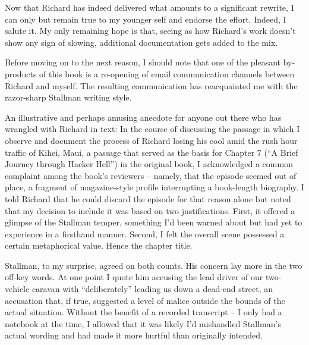\ifdefined\chs

\fi

\ifdefined\eng
Now that Richard has indeed delivered what amounts to a significant
rewrite, I can only but remain true to my younger self and endorse the
effort. Indeed, I salute it. My only remaining hope is that, seeing as
how Richard's work doesn't show any sign of slowing, additional
documentation gets added to the mix.
\fi

\ifdefined\chs

\fi

\ifdefined\eng
Before moving on to the next reason, I should note that one of the pleasant
by-products of this book is a re-opening of email communication
channels between Richard and myself. The resulting communication has
reacquainted me with the razor-sharp Stallman writing style.
\fi

\ifdefined\chs

\fi

\ifdefined\eng
An illustrative and perhaps amusing anecdote for anyone out there who
has wrangled with Richard in text: In the course of discussing the
passage in which I observe and document the process of Richard losing
his cool amid the rush hour traffic of Kihei, Maui, a passage that
served as the basis for Chapter 7 (``A Brief Journey through Hacker
Hell'') in the original book, I acknowledged a common complaint among
the book's reviewers -- namely, that the episode seemed out of place,
a fragment of magazine-style profile interrupting a book-length
biography. I told Richard that he could discard the episode for that
reason alone but noted that my decision to include it was based on two
justifications. First, it offered a glimpse of the Stallman temper,
something I'd been warned about but had yet to experience in a
firsthand manner. Second, I felt the overall scene possessed a certain
metaphorical value. Hence the chapter title.
\fi

\ifdefined\chs

\fi

\ifdefined\eng
Stallman, to my surprise, agreed on both counts. His concern lay more
in the two off-key words. At one point I quote him accusing the lead
driver of our two-vehicle caravan with ``deliberately'' leading us
down a dead-end street, an accusation that, if true, suggested a level
of malice outside the bounds of the actual situation. Without the
benefit of a recorded transcript -- I only had a notebook at the time,
I allowed that it was likely I'd mishandled Stallman's actual wording
and had made it more hurtful than originally intended.
\fi

